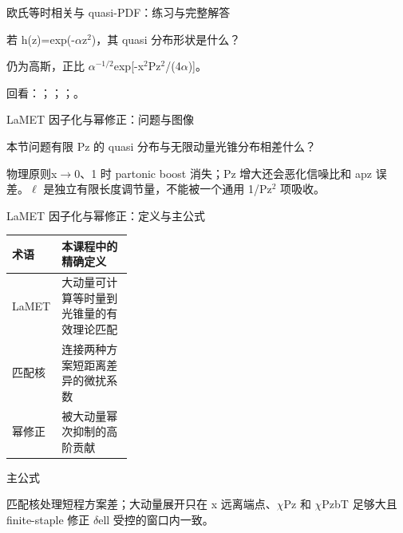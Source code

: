 \begin{frame}[t]{欧氏等时相关与 quasi-PDF：练习与完整解答}
\footnotesize
\begin{block}{}若 h(z)=exp(-\ensuremath{\alpha}z\ensuremath{^{2}})，其 quasi 分布形状是什么？\end{block}
\begin{exampleblock}{}仍为高斯，正比 \ensuremath{\alpha}\ensuremath{^{-1/2}}exp[-x\ensuremath{^{2}}Pz\ensuremath{^{2}}/\allowbreak{}(4\ensuremath{\alpha})]。\end{exampleblock}
\vfill
\scriptsize 回看：；；；。
\end{frame}

\begin{frame}[t]{LaMET 因子化与幂修正：问题与图像}
\footnotesize
\begin{block}{本节问题}有限 Pz 的 quasi 分布与无限动量光锥分布相差什么？\end{block}
\begin{block}{物理原则}\quad x\ensuremath{\rightarrow}0、1 时 partonic boost 消失；Pz 增大还会恶化信噪比和 apz 误差。\ensuremath{\ell} 是独立有限长度调节量，不能被一个通用 1/\allowbreak{}Pz\ensuremath{^{2}} 项吸收。\end{block}
\end{frame}

\begin{frame}[t]{LaMET 因子化与幂修正：定义与主公式}
\footnotesize\begin{tabularx}{\linewidth}{p{0.30\linewidth}Y}
\toprule 术语 & 本课程中的精确定义\\\midrule
{} LaMET & 大动量可计算等时量到光锥量的有效理论匹配\\
 匹配核 & 连接两种方案短距离差异的微扰系数\\
 幂修正 & 被大动量幂次抑制的高阶贡献\\
\bottomrule\end{tabularx}\vspace{0.15cm}
\begin{block}{ 主公式}\centering{}\end{block}
匹配核处理短程方案差；大动量展开只在 x 远离端点、\ensuremath{\chi}Pz 和 \ensuremath{\chi}PzbT 足够大且 finite-staple 修正 \ensuremath{\delta}ell 受控的窗口内一致。
\end{frame}

